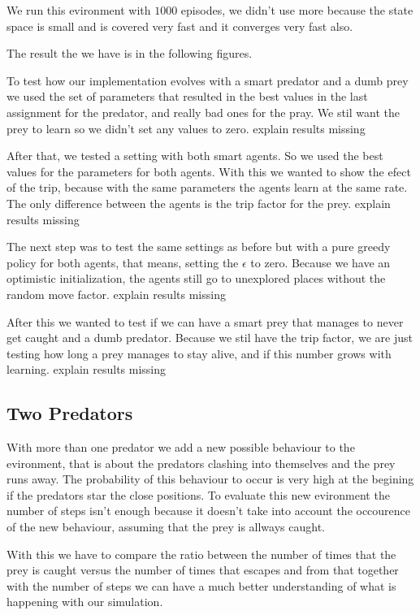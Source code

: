 \documentclass{article}
\begin{document}
We run this evironment with $1000$ episodes, we didn't use more because the
state space is small and is covered very fast and it converges very fast also.

The result the we have is in the following figures.

To test how our implementation evolves with a smart predator and a dumb prey we
used the set of parameters that resulted in the best values in the last
assignment for the predator, and really bad ones for the pray. We stil want the
prey to learn so we didn't set any values to zero.
\error explain results missing



After that, we tested a setting with both smart agents. So we used the best
values for the parameters for both agents. With this we wanted to show the efect
of the trip, because with the same parameters the agents learn at the same rate.
The only difference between the agents is the trip factor for the prey.
\error explain results missing

The next step was to test the same settings as before but with a pure greedy
policy for both agents, that means, setting the $\epsilon$ to zero. Because we
have an optimistic initialization, the agents still go to unexplored places
without the random move factor.
\error explain results missing

After this we wanted to test if we can have a smart prey that manages to never
get caught and a dumb predator. Because we stil have the trip
factor, we are just testing how long a prey manages to stay alive, and if this
number grows with learning.
\error explain results missing


\subsection{Two Predators}
\label{twoP}
With more than one predator we add a new possible behaviour to the evironment,
that is about the predators clashing into themselves and the prey runs away. The
probability of this behaviour to occur is very high at the begining if the
predators star the close positions. To evaluate this new evironment the number
of steps isn't enough because it doesn't take into account the occourence of the
new behaviour, assuming that the prey is allways caught. 

With this we have to compare the ratio between the number of times that the prey
is caught versus the number of times that escapes and from that together
with the number of steps we can have a much better understanding of what is
happening with our simulation.
\end{document}
